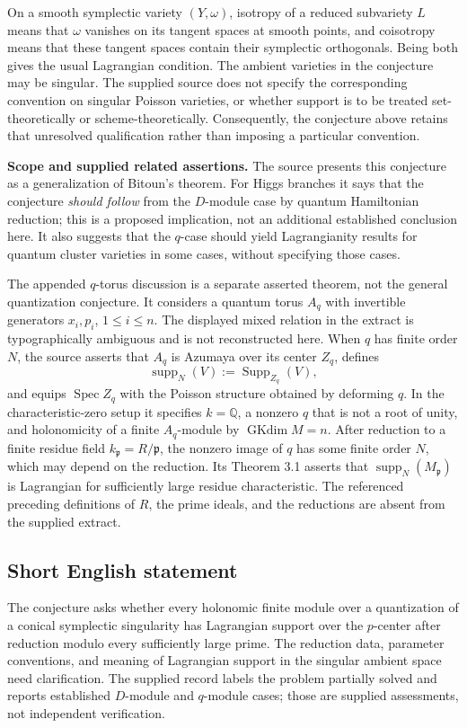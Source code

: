 \documentclass[11pt]{article}
\newcommand{\Q}{\mathbb{Q}}
\begin{document}
On a smooth symplectic variety \((Y,\omega)\), isotropy of a reduced subvariety \(L\) means that \(\omega\) vanishes on its tangent spaces at smooth points, and coisotropy means that these tangent spaces contain their symplectic orthogonals. Being both gives the usual Lagrangian condition. The ambient varieties in the conjecture may be singular. The supplied source does not specify the corresponding convention on singular Poisson varieties, or whether support is to be treated set-theoretically or scheme-theoretically. Consequently, the conjecture above retains that unresolved qualification rather than imposing a particular convention.

\textbf{Scope and supplied related assertions.}
The source presents this conjecture as a generalization of Bitoun's theorem. For Higgs branches it says that the conjecture \emph{should follow} from the \(D\)-module case by quantum Hamiltonian reduction; this is a proposed implication, not an additional established conclusion here. It also suggests that the \(q\)-case should yield Lagrangianity results for quantum cluster varieties in some cases, without specifying those cases.

The appended \(q\)-torus discussion is a separate asserted theorem, not the general quantization conjecture. It considers a quantum torus \(A_q\) with invertible generators \(x_i,p_i\), \(1\le i\le n\). The displayed mixed relation in the extract is typographically ambiguous and is not reconstructed here. When \(q\) has finite order \(N\), the source asserts that \(A_q\) is Azumaya over its center \(Z_q\), defines
\[
\operatorname{supp}_N(V):=\operatorname{Supp}_{Z_q}(V),
\]
and equips \(\operatorname{Spec}Z_q\) with the Poisson structure obtained by deforming \(q\). In the characteristic-zero setup it specifies \(k=\Q\), a nonzero \(q\) that is not a root of unity, and holonomicity of a finite \(A_q\)-module by \(\operatorname{GKdim}M=n\). After reduction to a finite residue field \(k_{\mathfrak p}=R/\mathfrak p\), the nonzero image of \(q\) has some finite order \(N\), which may depend on the reduction. Its Theorem 3.1 asserts that \(\operatorname{supp}_N(M_{\mathfrak p})\) is Lagrangian for sufficiently large residue characteristic. The referenced preceding definitions of \(R\), the prime ideals, and the reductions are absent from the supplied extract.
\subsection{Short English statement}
The conjecture asks whether every holonomic finite module over a quantization of a conical symplectic singularity has Lagrangian support over the \(p\)-center after reduction modulo every sufficiently large prime. The reduction data, parameter conventions, and meaning of Lagrangian support in the singular ambient space need clarification. The supplied record labels the problem partially solved and reports established \(D\)-module and \(q\)-module cases; those are supplied assessments, not independent verification.
\end{document}

